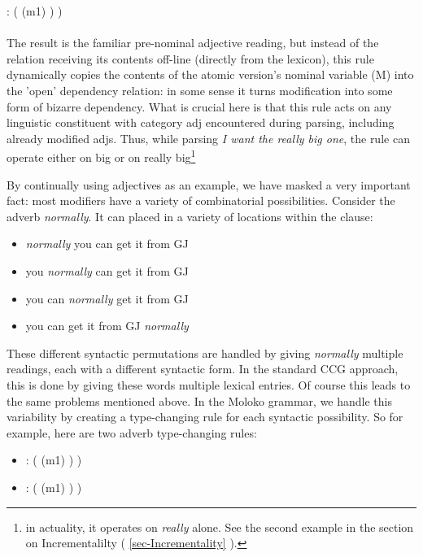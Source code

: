    \arrow {}  : (  (m1) ) ) \\ \\
The result is the familiar pre-nominal adjective reading, but instead of the   relation receiving its contents off-line (directly from the lexicon), this rule dynamically copies the contents of the atomic version's nominal variable (M) into the 'open' dependency relation: in some sense it turns modification into some form of bizarre dependency. What is crucial here is that this rule acts on any linguistic constituent with category adj encountered during parsing, including already modified adjs.
Thus, while parsing \emph{I want the really big one}, the rule can operate either on {big} or on {really big}\footnote{ in actuality, it operates on \emph{really} alone. See the second example in the section on Incrementalilty ( \ref{sec-Incrementality} ).}

By continually using adjectives as an example, we have masked a very important fact: most modifiers have a variety of combinatorial possibilities. Consider the adverb \emph{normally}. It can placed in a variety of locations within the clause:
\begin{itemize}
\item	\emph{normally} you can get it from GJ
\item	you \emph{normally} can get it from GJ
\item	you can \emph{normally} get it from GJ
\item	you can get it from GJ \emph{normally}
\end{itemize}
These different syntactic permutations are handled by giving \emph{normally} multiple readings, each with a different syntactic form. In the standard \textsc{CCG} approach, this is done by giving these words multiple lexical entries. Of course this leads to the same problems mentioned above. In the Moloko grammar, we handle this variability by creating a type-changing rule for each syntactic possibility. So for example, here are two adverb type-changing rules: 

\begin{itemize}
\item {}   \arrow {}  : (  (m1) ) ) 
\item {}   \arrow {}  : (  (m1) ) )
\end{itemize}

